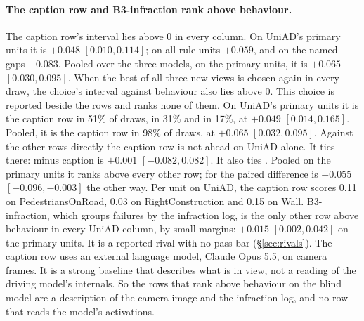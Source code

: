 \paragraph{The caption row and B3-infraction rank above behaviour.}
The caption row's interval lies above 0 in every column. On UniAD's primary
units it is $+0.048$ $[0.010, 0.114]$; on all rule units $+0.059$, and on the
named gaps $+0.083$. Pooled over the three models, on the primary units, it is
$+0.065$ $[0.030, 0.095]$.
When the best of all three new views is chosen again in every draw, the
choice's interval against behaviour also lies above 0. This choice is reported
beside the rows and ranks none of them. On UniAD's primary units it is the caption row in
51\% of draws,  in 31\% and  in 17\%, at
$+0.049$ $[0.014, 0.165]$. Pooled, it is the caption row in 98\% of draws, at
$+0.065$ $[0.032, 0.095]$.
Against the other rows directly the caption row is not ahead on UniAD alone. It
ties  there:  minus caption is $+0.001$
$[-0.082, 0.082]$. It also ties . Pooled on the primary units it ranks above every other row; for
 the paired difference is $-0.055$ $[-0.096, -0.003]$ the
other way.
Per unit on UniAD, the caption row scores 0.11 on PedestriansOnRoad, 0.03 on
RightConstruction and 0.15 on Wall.
B3-infraction, which groups failures by the infraction log, is the only other
row above behaviour in every UniAD column, by small margins: $+0.015$ $[0.002,
0.042]$ on the primary units. It is a reported rival with no pass bar
(\S\ref{sec:rivals}).
The caption row uses an external language model, Claude Opus 5.5, on camera
frames. It is a strong baseline that describes what is in view, not a reading
of the driving model's internals. So the rows that rank above behaviour on the
blind model are a description of the camera image and the infraction log, and
no row that reads the model's activations.

